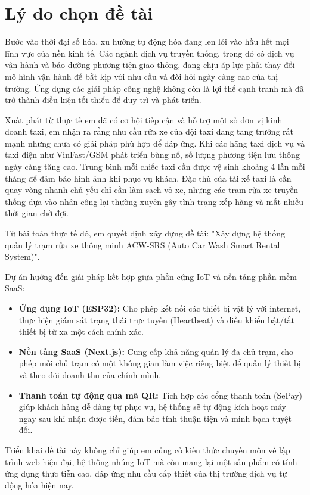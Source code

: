\documentclass[../main.tex]{subfiles}
\begin{document}
\section*{Lý do chọn đề tài}
Bước vào thời đại số hóa, xu hướng tự động hóa đang len lỏi vào hầu hết mọi lĩnh vực của nền kinh tế. Các ngành dịch vụ truyền thống, trong đó có dịch vụ vận hành và bảo dưỡng phương tiện giao thông, đang chịu áp lực phải thay đổi mô hình vận hành để bắt kịp với nhu cầu và đòi hỏi ngày càng cao của thị trường. Ứng dụng các giải pháp công nghệ không còn là lợi thế cạnh tranh mà đã trở thành điều kiện tối thiểu để duy trì và phát triển.

Xuất phát từ thực tế em đã có cơ hội tiếp cận và hỗ trợ một số đơn vị kinh doanh taxi, em nhận ra rằng nhu cầu rửa xe của đội taxi đang tăng trưởng rất mạnh nhưng chưa có giải pháp phù hợp để đáp ứng. Khi các hãng taxi dịch vụ và taxi điện như VinFast/GSM phát triển bùng nổ, số lượng phương tiện lưu thông ngày càng tăng cao. Trung bình mỗi chiếc taxi cần được vệ sinh khoảng 4 lần mỗi tháng để đảm bảo hình ảnh khi phục vụ khách. Đặc thù của tài xế taxi là cần quay vòng nhanh chủ yếu chỉ cần làm sạch vỏ xe, nhưng các trạm rửa xe truyền thống dựa vào nhân công lại thường xuyên gây tình trạng xếp hàng và mất nhiều thời gian chờ đợi.

Từ bài toán thực tế đó, em quyết định xây dựng đề tài: "Xây dựng hệ thống quản lý trạm rửa xe thông minh ACW-SRS (Auto Car Wash Smart Rental System)".

Dự án hướng đến giải pháp kết hợp giữa phần cứng IoT và nền tảng phần mềm SaaS:
\begin{itemize}
    \item \textbf{Ứng dụng IoT (ESP32):} Cho phép kết nối các thiết bị vật lý với internet, thực hiện giám sát trạng thái trực tuyến (Heartbeat) và điều khiển bật/tắt thiết bị từ xa một cách chính xác.
    \item \textbf{Nền tảng SaaS (Next.js):} Cung cấp khả năng quản lý đa chủ trạm, cho phép mỗi chủ trạm có một không gian làm việc riêng biệt để quản lý thiết bị và theo dõi doanh thu của chính mình.
    \item \textbf{Thanh toán tự động qua mã QR:} Tích hợp các cổng thanh toán (SePay) giúp khách hàng dễ dàng tự phục vụ, hệ thống sẽ tự động kích hoạt máy ngay sau khi nhận được tiền, đảm bảo tính thuận tiện và minh bạch tuyệt đối.
\end{itemize}

Triển khai đề tài này không chỉ giúp em củng cố kiến thức chuyên môn về lập trình web hiện đại, hệ thống nhúng IoT mà còn mang lại một sản phẩm có tính ứng dụng thực tiễn cao, đáp ứng nhu cầu cấp thiết của thị trường dịch vụ tự động hóa hiện nay.
\end{document}
